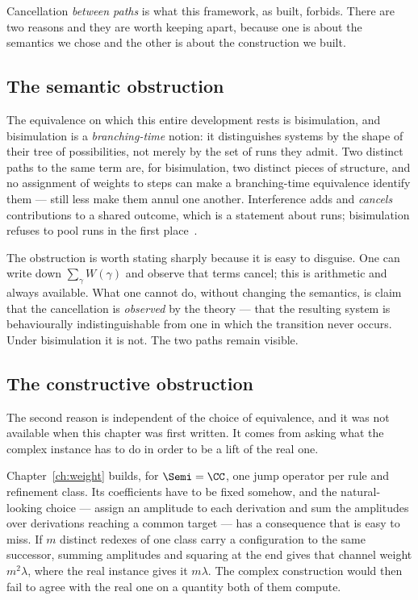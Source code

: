 Cancellation \emph{between paths} is what this framework, as built,
forbids.  There are two reasons and they are worth keeping apart, because
one is about the semantics we chose and the other is about the
construction we built.

\subsection{The semantic obstruction}

\begin{remark}
\label{rmk:obstruction}
The equivalence on which this entire development rests is bisimulation,
and bisimulation is a \emph{branching-time} notion: it distinguishes
systems by the shape of their tree of possibilities, not merely by the set
of runs they admit.  Two distinct paths to the same term are, for
bisimulation, two distinct pieces of structure, and no assignment of
weights to steps can make a branching-time equivalence identify them ---
still less make them annul one another.  Interference adds and
\emph{cancels} contributions to a shared outcome, which is a statement
about runs; bisimulation refuses to pool runs in the first
place~\cite[\S13]{CE}.
\end{remark}

The obstruction is worth stating sharply because it is easy to disguise.
One can write down $\sum_\gamma W(\gamma)$ and observe that terms cancel;
this is arithmetic and always available.  What one cannot do, without
changing the semantics, is claim that the cancellation is \emph{observed}
by the theory --- that the resulting system is behaviourally
indistinguishable from one in which the transition never occurs.  Under
bisimulation it is not.  The two paths remain visible.

\subsection{The constructive obstruction}

The second reason is independent of the choice of equivalence, and it was
not available when this chapter was first written.  It comes from asking
what the complex instance has to do in order to be a lift of the real one.

Chapter~\ref{ch:weight} builds, for $\Semi = \CC$, one jump operator per
rule and refinement class.  Its coefficients have to be fixed somehow, and
the natural-looking choice --- assign an amplitude to each derivation and
sum the amplitudes over derivations reaching a common target --- has a
consequence that is easy to miss.  If $m$ distinct redexes of one class
carry a configuration to the same successor, summing amplitudes and
squaring at the end gives that channel weight $m^2\lambda$, where the real
instance gives it $m\lambda$.  The complex construction would then fail to
agree with the real one on a quantity both of them compute.

